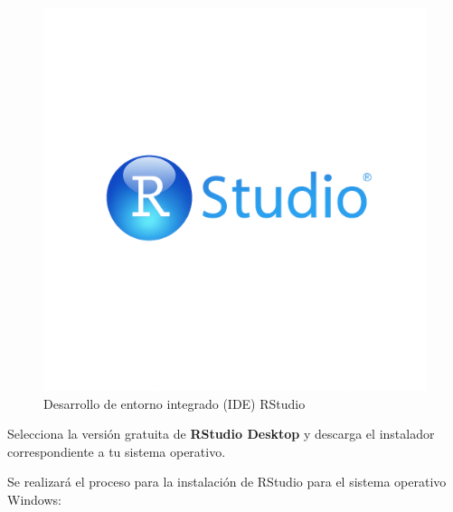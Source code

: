 \documentclass[
]{book}
\begin{document}
\begin{itemize}
ps://posit.co/download/rstudio-desktop/}):
\end{itemize}

\begin{figure}

{\centering \includegraphics[width=0.3\linewidth]{images/rstudiosinfondo} 

}

\caption{Desarrollo de entorno integrado (IDE) RStudio}\label{fig:rs-fig}
\end{figure}

Selecciona la versión gratuita de \textbf{RStudio Desktop} y descarga el instalador correspondiente a tu sistema operativo.

Se realizará el proceso para la instalación de RStudio para el sistema operativo Windows:
\end{document}
